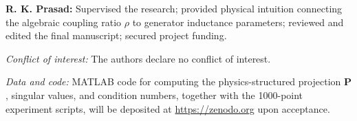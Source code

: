 \documentclass[11pt,a4paper]{article}
\begin{document}
\textbf{R. K. Prasad:} Supervised the research; provided physical
intuition connecting the algebraic coupling ratio $\rho$ to generator
inductance parameters; reviewed and edited the final manuscript; secured
project funding.

\bigskip
\noindent\textit{Conflict of interest:} The authors declare no conflict
of interest.

\bigskip
\noindent\textit{Data and code:} MATLAB code for computing the
physics-structured projection $\mathbf{P}$, singular values, and
condition numbers, together with the 1000-point experiment scripts,
will be deposited at \url{https://zenodo.org} upon acceptance.
\end{document}
